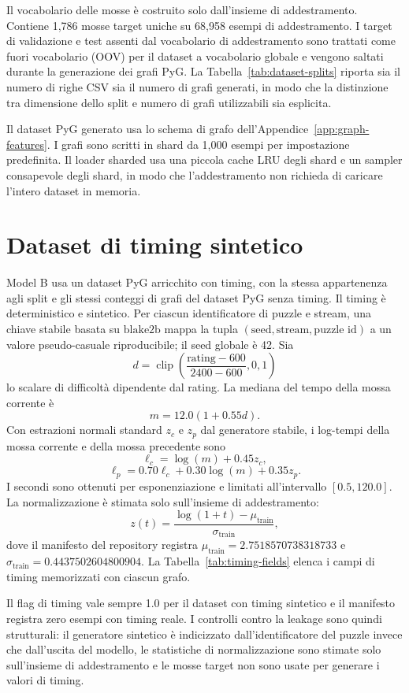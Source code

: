 Il vocabolario delle mosse è costruito solo dall'insieme di addestramento.  Contiene 1,786 mosse target uniche su 68,958 esempi di addestramento.  I target di validazione e test assenti dal vocabolario di addestramento sono trattati come fuori vocabolario (OOV) per il dataset a vocabolario globale e vengono saltati durante la generazione dei grafi PyG.  La Tabella~\ref{tab:dataset-splits} riporta sia il numero di righe CSV sia il numero di grafi generati, in modo che la distinzione tra dimensione dello split e numero di grafi utilizzabili sia esplicita.



Il dataset PyG generato usa lo schema di grafo dell'Appendice~\ref{app:graph-features}.  I grafi sono scritti in shard da 1,000 esempi per impostazione predefinita.  Il loader sharded usa una piccola cache LRU degli shard e un sampler consapevole degli shard, in modo che l'addestramento non richieda di caricare l'intero dataset in memoria.

\section{Dataset di timing sintetico}
\label{app:data-pipeline:timing}

Model B usa un dataset PyG arricchito con timing, con la stessa appartenenza agli split e gli stessi conteggi di grafi del dataset PyG senza timing.  Il timing è deterministico e sintetico.  Per ciascun identificatore di puzzle e stream, una chiave stabile basata su \(\mathrm{blake2b}\) mappa la tupla \((\text{seed},\text{stream},\text{puzzle id})\) a un valore pseudo-casuale riproducibile; il seed globale è 42.  Sia
\[
d=\operatorname{clip}\left(\frac{\text{rating}-600}{2400-600},0,1\right)
\]
lo scalare di difficoltà dipendente dal rating.  La mediana del tempo della mossa corrente è
\[
m=12.0(1+0.55d).
\]
Con estrazioni normali standard \(z_c\) e \(z_p\) dal generatore stabile, i log-tempi della mossa corrente e della mossa precedente sono
\[
\ell_c=\log(m)+0.45z_c,
\]
\[
\ell_p=0.70\ell_c+0.30\log(m)+0.35z_p.
\]
I secondi sono ottenuti per esponenziazione e limitati all'intervallo \([0.5,120.0]\).  La normalizzazione è stimata solo sull'insieme di addestramento:
\[
z(t)=\frac{\log(1+t)-\mu_{\mathrm{train}}}{\sigma_{\mathrm{train}}},
\]
dove il manifesto del repository registra \(\mu_{\mathrm{train}}=2.7518570738318733\) e \(\sigma_{\mathrm{train}}=0.4437502604800904\).  La Tabella~\ref{tab:timing-fields} elenca i campi di timing memorizzati con ciascun grafo.



Il flag di timing vale sempre 1.0 per il dataset con timing sintetico e il manifesto registra zero esempi con timing reale.  I controlli contro la leakage sono quindi strutturali: il generatore sintetico è indicizzato dall'identificatore del puzzle invece che dall'uscita del modello, le statistiche di normalizzazione sono stimate solo sull'insieme di addestramento e le mosse target non sono usate per generare i valori di timing.
